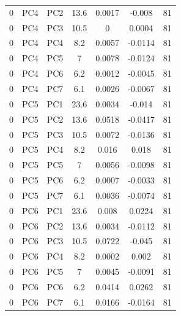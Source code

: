 \begin{table}[htbp]
\begin{tabular}{lcccccc}
        0 & PC4 & PC2 & 13.6 & 0.0017 & -0.008 & 81 \\
        0 & PC4 & PC3 & 10.5 & 0 & 0.0004 & 81 \\
        0 & PC4 & PC4 & 8.2 & 0.0057 & -0.0114 & 81 \\
        0 & PC4 & PC5 & 7 & 0.0078 & -0.0124 & 81 \\
        0 & PC4 & PC6 & 6.2 & 0.0012 & -0.0045 & 81 \\
        0 & PC4 & PC7 & 6.1 & 0.0026 & -0.0067 & 81 \\
        0 & PC5 & PC1 & 23.6 & 0.0034 & -0.014 & 81 \\
        0 & PC5 & PC2 & 13.6 & 0.0518 & -0.0417 & 81 \\
        0 & PC5 & PC3 & 10.5 & 0.0072 & -0.0136 & 81 \\
        0 & PC5 & PC4 & 8.2 & 0.016 & 0.018 & 81 \\
        0 & PC5 & PC5 & 7 & 0.0056 & -0.0098 & 81 \\
        0 & PC5 & PC6 & 6.2 & 0.0007 & -0.0033 & 81 \\
        0 & PC5 & PC7 & 6.1 & 0.0036 & -0.0074 & 81 \\
        0 & PC6 & PC1 & 23.6 & 0.008 & 0.0224 & 81 \\
        0 & PC6 & PC2 & 13.6 & 0.0034 & -0.0112 & 81 \\
        0 & PC6 & PC3 & 10.5 & 0.0722 & -0.045 & 81 \\
        0 & PC6 & PC4 & 8.2 & 0.0002 & 0.002 & 81 \\
        0 & PC6 & PC5 & 7 & 0.0045 & -0.0091 & 81 \\
        0 & PC6 & PC6 & 6.2 & 0.0414 & 0.0262 & 81 \\
        0 & PC6 & PC7 & 6.1 & 0.0166 & -0.0164 & 81 \\
        \bottomrule
    \end{tabular}
\end{table}


